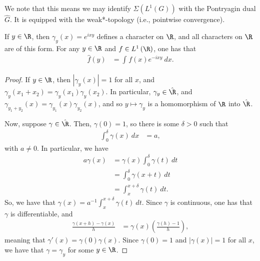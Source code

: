 \documentclass[10pt]{mypackage}
\begin{document}
We note that this means we may identify $\Sigma\left( L^1\left( G \right) \right)$ with the Pontryagin dual $\hat{G}$. It is equipped with the weak*-topology (i.e., pointwise convergence).
\begin{theorem}
  If $y\in \R$, then $\gamma_y(x) = e^{ixy}$ defines a character on $\R$, and all characters on $\R$ are of this form. For any $y\in \R$ and $f\in L^1\left( \R \right)$, one has that
  \begin{align*}
    \hat{f}(y) &= \int_{}^{} f(x)e^{-ixy}\:dx.
  \end{align*}
\end{theorem}
\begin{proof}
  If $y\in \R$, then $\left\vert \gamma_y(x) \right\vert = 1$ for all $x$, and $\gamma_y\left( x_1 + x_2 \right) = \gamma_y\left(x_1\right)\gamma_y\left( x_2 \right)$. In particular, $\gamma_y\in \hat{\R}$, and $\gamma_{y_1 + y_2}(x) = \gamma_{y_1}(x) \gamma_{y_2}(x)$, and so $y\mapsto \gamma_y$ is a homomorphism of $\R$ into $\hat{\R}$.

  Now, suppose $\gamma\in \hat{\R}$. Then, $\gamma(0) = 1$, so there is some $\delta > 0$ such that
  \begin{align*}
    \int_{0}^{\delta} \gamma(x)\:dx &= a,
  \end{align*}
  with $a\neq 0$. In particular, we have
  \begin{align*}
    a\gamma(x) &= \gamma(x)\int_{0}^{\delta} \gamma(t)\:dt\\
               &= \int_{0}^{\delta} \gamma\left( x + t \right)\:dt\\
               &= \int_{x}^{x + \delta} \gamma(t)\:dt.
  \end{align*}
  So, we have that $\gamma(x) = a^{-1}\int_{x}^{x+\delta} \gamma(t)\:dt$. Since $\gamma$ is continuous, one has that $\gamma$ is differentiable, and
  \begin{align*}
    \frac{\gamma\left( x+h \right)-\gamma(x)}{h} &= \gamma(x) \left( \frac{\gamma(h)-1}{h} \right),
  \end{align*}
  meaning that $\gamma'(x) = \gamma(0)\gamma(x)$. Since $\gamma(0) = 1$ and $\left\vert \gamma(x) \right\vert = 1$ for all $x$, we have that $\gamma = \gamma_y$ for some $y\in \R$.
\end{proof}
\end{document}
